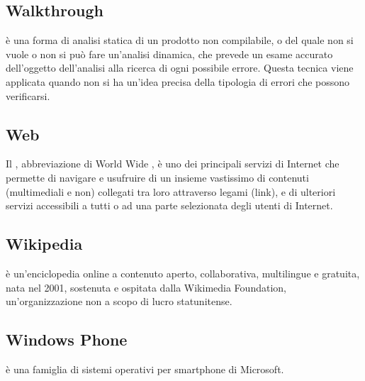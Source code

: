 \subsection*{Walkthrough }
 è una forma di analisi statica di un prodotto non compilabile, o del
quale non si vuole o non si può fare un'analisi dinamica, che prevede un esame accurato
dell'oggetto dell'analisi alla ricerca di ogni possibile errore. Questa tecnica viene applicata
quando non si ha un'idea precisa della tipologia di errori che possono verificarsi.

\subsection*{Web}
Il , abbreviazione di World Wide , è uno dei principali servizi di Internet che permette di navigare e usufruire di un insieme vastissimo di contenuti (multimediali e non) collegati tra loro attraverso legami (link), e di ulteriori servizi accessibili a tutti o ad una parte selezionata degli utenti di Internet.

\subsection*{Wikipedia}
 è un'enciclopedia online a contenuto aperto, collaborativa, multilingue e gratuita, nata nel 2001, sostenuta e ospitata dalla Wikimedia Foundation, un'organizzazione non a scopo di lucro statunitense.

\subsection*{Windows Phone}
 è una famiglia di sistemi operativi per smartphone di Microsoft.


